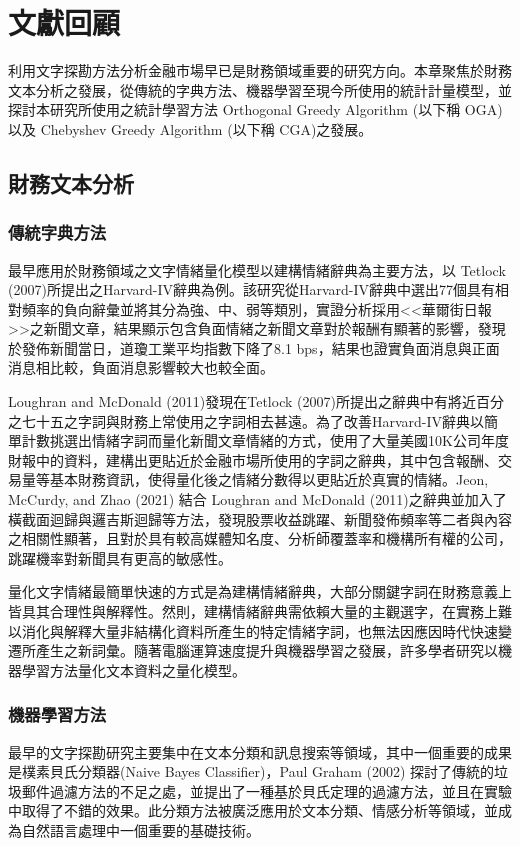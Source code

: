 \chapter{文獻回顧}
利用文字探勘方法分析金融市場早已是財務領域重要的研究方向。本章聚焦於財務文本分析之發展，從傳統的字典方法、機器學習至現今所使用的統計計量模型，並探討本研究所使用之統計學習方法 Orthogonal Greedy Algorithm (以下稱 OGA) 以及 Chebyshev Greedy Algorithm (以下稱 CGA)之發展。
\section{財務文本分析}
\subsection{傳統字典方法}
最早應用於財務領域之文字情緒量化模型以建構情緒辭典為主要方法，以 Tetlock (2007)所提出之Harvard-IV辭典為例。該研究從Harvard-IV辭典中選出77個具有相對頻率的負向辭彙並將其分為強、中、弱等類別，實證分析採用<<華爾街日報>>之新聞文章，結果顯示包含負面情緒之新聞文章對於報酬有顯著的影響，發現於發佈新聞當日，道瓊工業平均指數下降了8.1 bps，結果也證實負面消息與正面消息相比較，負面消息影響較大也較全面。

Loughran and McDonald (2011)發現在Tetlock (2007)所提出之辭典中有將近百分之七十五之字詞與財務上常使用之字詞相去甚遠。為了改善Harvard-IV辭典以簡單計數挑選出情緒字詞而量化新聞文章情緒的方式，使用了大量美國10K公司年度財報中的資料，建構出更貼近於金融市場所使用的字詞之辭典，其中包含報酬、交易量等基本財務資訊，使得量化後之情緒分數得以更貼近於真實的情緒。Jeon, McCurdy, and Zhao (2021) 結合 Loughran and McDonald (2011)之辭典並加入了橫截面迴歸與邏吉斯迴歸等方法，發現股票收益跳躍、新聞發佈頻率等二者與內容之相關性顯著，且對於具有較高媒體知名度、分析師覆蓋率和機構所有權的公司，跳躍機率對新聞具有更高的敏感性。

量化文字情緒最簡單快速的方式是為建構情緒辭典，大部分關鍵字詞在財務意義上皆具其合理性與解釋性。然則，建構情緒辭典需依賴大量的主觀選字，在實務上難以消化與解釋大量非結構化資料所產生的特定情緒字詞，也無法因應因時代快速變遷所產生之新詞彙。隨著電腦運算速度提升與機器學習之發展，許多學者研究以機器學習方法量化文本資料之量化模型。
\subsection{機器學習方法}
最早的文字探勘研究主要集中在文本分類和訊息搜索等領域，其中一個重要的成果是樸素貝氏分類器(Naive Bayes Classifier)，Paul Graham (2002) 探討了傳統的垃圾郵件過濾方法的不足之處，並提出了一種基於貝氏定理的過濾方法，並且在實驗中取得了不錯的效果。此分類方法被廣泛應用於文本分類、情感分析等領域，並成為自然語言處理中一個重要的基礎技術。

